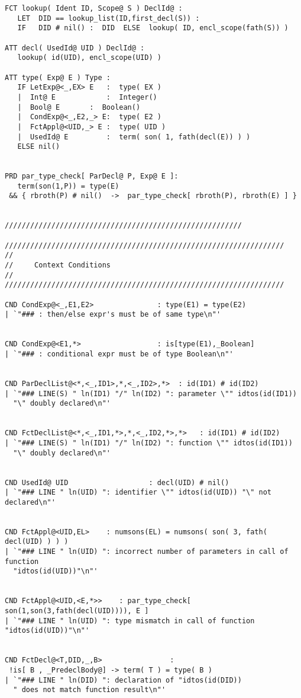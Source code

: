 \begin{verbatim}
FCT lookup( Ident ID, Scope@ S ) DeclId@ :
   LET  DID == lookup_list(ID,first_decl(S)) :
   IF   DID # nil() :  DID  ELSE  lookup( ID, encl_scope(fath(S)) )

ATT decl( UsedId@ UID ) DeclId@ :
   lookup( id(UID), encl_scope(UID) )

ATT type( Exp@ E ) Type :
   IF LetExp@<_,EX> E   :  type( EX )
   |  Int@ E            :  Integer()
   |  Bool@ E   	:  Boolean()
   |  CondExp@<_,E2,_> E:  type( E2 ) 
   |  FctAppl@<UID,_> E :  type( UID ) 
   |  UsedId@ E         :  term( son( 1, fath(decl(E)) ) )
   ELSE nil()


PRD par_type_check[ ParDecl@ P, Exp@ E ]:
   term(son(1,P)) = type(E)
 && { rbroth(P) # nil()  ->  par_type_check[ rbroth(P), rbroth(E) ] }
   

////////////////////////////////////////////////////////

//////////////////////////////////////////////////////////////////
//
//     Context Conditions 
//
//////////////////////////////////////////////////////////////////

CND CondExp@<_,E1,E2>               : type(E1) = type(E2)
| `"### : then/else expr's must be of same type\n"'


CND CondExp@<E1,*>                  : is[type(E1),_Boolean] 
| `"### : conditional expr must be of type Boolean\n"'


CND ParDeclList@<*,<_,ID1>,*,<_,ID2>,*>  : id(ID1) # id(ID2)
| `"### LINE(S) " ln(ID1) "/" ln(ID2) ": parameter \"" idtos(id(ID1))
  "\" doubly declared\n"'


CND FctDeclList@<*,<_,ID1,*>,*,<_,ID2,*>,*>   : id(ID1) # id(ID2)
| `"### LINE(S) " ln(ID1) "/" ln(ID2) ": function \"" idtos(id(ID1))
  "\" doubly declared\n"'


CND UsedId@ UID                   : decl(UID) # nil()
| `"### LINE " ln(UID) ": identifier \"" idtos(id(UID)) "\" not declared\n"'


CND FctAppl@<UID,EL>    : numsons(EL) = numsons( son( 3, fath( decl(UID) ) ) )
| `"### LINE " ln(UID) ": incorrect number of parameters in call of function
  "idtos(id(UID))"\n"'


CND FctAppl@<UID,<E,*>>    : par_type_check[ son(1,son(3,fath(decl(UID)))), E ]
| `"### LINE " ln(UID) ": type mismatch in call of function "idtos(id(UID))"\n"'


CND FctDecl@<T,DID,_,B>                :
 !is[ B , _PredeclBody@] -> term( T ) = type( B )
| `"### LINE " ln(DID) ": declaration of "idtos(id(DID))
  " does not match function result\n"'



\end{verbatim}
